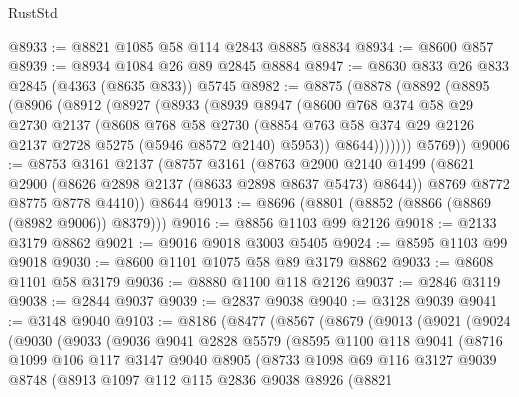 \begin{lexlean}{RustStd}
\begin{coremodule}
{\begin{coremodule}
{{{{{{{{{{{{{{{{@8933 := @8821 @1085 @58 @114 @2843 @8885 @8834
@8934 := @8600 @857
@8939 := @8934 @1084 @26 @89 @2845 @8884
@8947 := @8630 @833 @26 @833 @2845 (@4363 (@8635 @833)) @5745
@8982 := @8875
    (@8878
      (@8892
        (@8895
          (@8906
            (@8912
              (@8927
                (@8933
                  (@8939
                    @8947
                    (@8600
                      @768
                      @374
                      @58
                      @29
                      @2730
                      @2137
                      (@8608
                        @768
                        @58
                        @2730
                        (@8854 @763 @58 @374 @29 @2126 @2137 @2728 @5275 (@5946 @8572 @2140) @5953))
                      @8644)))))))
        @5769))
@9006 := @8753
    @3161
    @2137
    (@8757
      @3161
      (@8763
        @2900
        @2140
        @1499
        (@8621 @2900 (@8626 @2898 @2137 (@8633 @2898 @8637 @5473) @8644))
        @8769
        @8772
        @8775
        @8778
        @4410))
    @8644
@9013 := @8696 (@8801 (@8852 (@8866 (@8869 (@8982 @9006)) @8379)))
@9016 := @8856 @1103 @99 @2126
@9018 := @2133 @3179 @8862
@9021 := @9016 @9018 @3003 @5405
@9024 := @8595 @1103 @99 @9018
@9030 := @8600 @1101 @1075 @58 @89 @3179 @8862
@9033 := @8608 @1101 @58 @3179
@9036 := @8880 @1100 @118 @2126
@9037 := @2846 @3119
@9038 := @2844 @9037
@9039 := @2837 @9038
@9040 := @3128 @9039
@9041 := @3148 @9040
@9103 := @8186
    (@8477
      (@8567
        (@8679
          (@9013
            (@9021
              (@9024
                (@9030
                  (@9033
                    (@9036
                      @9041
                      @2828
                      @5579
                      (@8595
                        @1100
                        @118
                        @9041
                        (@8716
                          @1099
                          @106
                          @117
                          @3147
                          @9040
                          @8905
                          (@8733
                            @1098
                            @69
                            @116
                            @3127
                            @9039
                            @8748
                            (@8913
                              @1097
                              @112
                              @115
                              @2836
                              @9038
                              @8926
                              (@8821
}}}}}}}}}}}}}}}}
\end{coremodule}}
\end{coremodule}
\end{lexlean}
